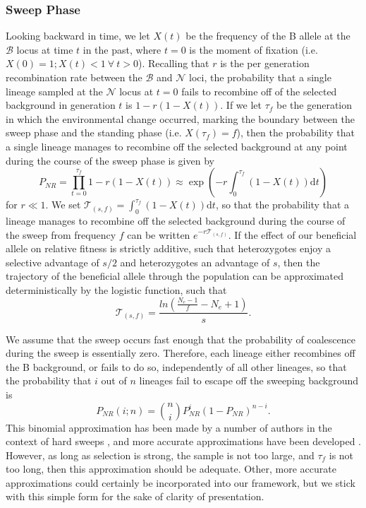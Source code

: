 \documentclass[a4paper,10pt]{article}
\newcommand{\fancyN}{$\mathcal N$ }
\newcommand{\fancyB}{$\mathcal B$ }
\begin{document}
\subsubsection{Sweep Phase}
Looking backward in time, we let $X\left(t\right)$ be the frequency of the B allele at the \fancyB locus at time $t$ in the past, where $t=0$ is the moment of fixation (i.e. $X\left(0\right) = 1; X\left(t\right) < 1\ \forall\ t > 0$). Recalling that $r$ is the per generation recombination rate between the \fancyB and \fancyN loci, the probability that a single lineage sampled at the \fancyN locus at $t=0$ fails to recombine off of the selected background in generation $t$ is $1-r\left(1-X(t)\right)$. If we let $\tau_{f}$ be the generation in which the environmental change occurred, marking the boundary between the sweep phase and the standing phase (i.e. $X\left(\tau_{f}\right) = f$), then the probability that a single lineage manages to recombine off the selected background at any point during the course of the sweep phase is given by
\begin{equation}
P_{NR} = \prod_{t=0}^{\tau_{f}} 1-r\left(1-X(t)\right)  \approx \exp \left(-r \int_0^{\tau_{f}}(1-X\left(t\right))\mathrm{d} t \right)
\end{equation}
for $r \ll 1$. We set  $\mathcal{T}_{\left(s,f\right)} = \int_0^{\tau_{f}}(1-X\left(t\right))\mathrm{d}t$, so that the probability that a lineage manages to recombine off the selected background during the course of the sweep from frequency $f$ can be written $e^{-r\mathcal{T}_{\left(s,f\right)}}$. If the effect of our beneficial allele on relative fitness is strictly additive, such that heterozygotes enjoy a selective advantage of $s/2$ and heterozygotes an advantage of $s$, then the trajectory of the beneficial allele through the population can be approximated deterministically by the logistic function, such that 
\begin{equation}
	\mathcal{T}_{\left(s,f\right)} = \frac{ln\left(\frac{N_e - 1}{f}-N_e + 1\right)}{s}.
\end{equation}

We assume that the sweep occurs fast enough that the probability of coalescence during the sweep is essentially zero. Therefore, each lineage either recombines off the B background, or fails to do so, independently of all other lineages, so that the probability that $i$ out of $n$ lineages fail to escape off the sweeping background is
\begin{equation}
P_{NR}(i;n) = {n \choose i} P_{NR}^{i} (1-P_{NR})^{n-i}.
\end{equation}
This binomial approximation has been made by a number of authors in the context of hard sweeps \citep{Barton}, and more accurate approximations have been developed \citep{Etheridge2006}. However, as long as selection is strong, the sample is not too large,  and $\tau_{f}$ is not too long, then this approximation should be adequate. Other, more accurate approximations could certainly be incorporated into our framework, but we stick with this simple form for the sake of clarity of presentation.
\end{document}

